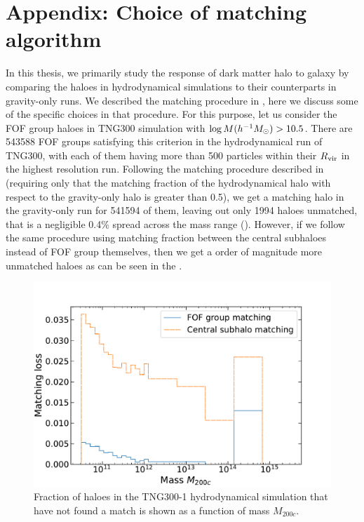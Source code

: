 \section{Appendix: Choice of matching algorithm}
\label{sec:apndx-matching-ch:sims}
In this thesis, we primarily study the response of dark matter halo to galaxy by comparing the haloes in hydrodynamical simulations to their counterparts in gravity-only runs.
We described the matching procedure in , here we discuss some of the specific choices in that procedure.
For this purpose, let us consider the FOF group haloes in TNG300 simulation with $\log M(h^{-1}M_{\odot})>10.5$.  There are 543588 FOF groups satisfying this criterion in the hydrodynamical run of TNG300, with each of them having more than 500 particles within their $R_{\rm vir}$ in the highest resolution run.
Following the matching procedure described in  (requiring only that the matching fraction of the hydrodynamical halo with respect to the gravity-only halo is greater than 0.5), we get a matching halo in the gravity-only run for 541594 of them, leaving out only 1994 haloes unmatched, that is a negligible 0.4\% spread across the mass range ().
However, if we follow the same procedure using matching fraction between the central subhaloes instead of FOF group themselves, then we get a order of magnitude more unmatched haloes as can be seen in the .  

\begin{figure}
    \includegraphics[width=\linewidth]{plots/hal_match_efficiency_mass.pdf}
    \caption{Fraction of haloes in the TNG300-1 hydrodynamical simulation that have not found a match is shown as a function of mass $M_{200c}$.}
    \label{fig:efficiency-mass-ch:sims}
\end{figure}

